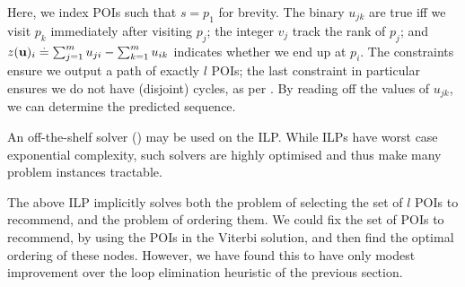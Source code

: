 \vspace{0.5\baselineskip}

Here, we index POIs such that $s = p_1$ for brevity.
The binary $u_{jk}$ are true iff
we visit $p_k$ immediately after visiting $p_j$;
the integer $v_j$ track the rank of $p_j$;
and $z(\mathbf{u})_i \stackrel{.}{=} \sum_{j=1}^m u_{ji} - \sum_{k=1}^m u_{ik}$ indicates whether we end up at $p_i$.
The constraints ensure we output a path of exactly $l$ POIs;
the last constraint in particular ensures we do not have (disjoint) cycles, as per \citet{Miller:1960}.
By reading off the values of $u_{jk}$, we can determine the predicted sequence.

An off-the-shelf solver () may be used on the ILP.
While ILPs have worst case exponential complexity,
such solvers are highly optimised and thus make many problem instances tractable.

The above ILP implicitly solves both the problem of selecting the set of $l$ POIs to recommend,
and the problem of ordering them.
We could fix the set of POIs to recommend, \eg by using the POIs in the Viterbi solution, and then find the optimal ordering of these nodes.
However, we have found this to have only modest improvement over the loop elimination heuristic of the previous section.
